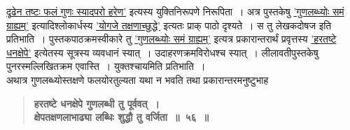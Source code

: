 \documentclass[11pt, openany]{book}
\begin{document}
\newpage

\begin{sloppypar}
\noindent \hyperref[5.51]{दृढेन तष्टः फलं गुणः स्यादपरो हरेण'} इत्यस्य युक्तिनिरूपणे निरूपिता~। अत्र पुस्तकेषु \hyperref[5.55]{'गुणलब्ध्योः समं ग्राह्यम्'} इत्यादिश्लोकार्धस्य \hyperref[5.54]{'योगजे तक्षणाच्छुद्धे'} इत्यतः प्राक् पाठो दृश्यते~। स तु लेखकदोषज इति प्रतिभाति~। पुस्तकपाठक्रमस्वीकारे तु \hyperref[5.55]{'गुणलब्ध्योः समं ग्राह्यम्'} इत्यत्र प्रकारान्तरार्थं प्रवृत्तस्य \hyperref[5.56]{'हरतष्टे धनक्षेपे'} इत्येतस्य सूत्रस्य व्यवधानं स्यात्~। उदाहरणक्रमविरोधश्च स्यात्~। लीलावतीपुस्तकेषु पुनरस्मल्लिखितक्रम एवास्ति~। युक्तश्चायमिति प्रतिभाति~। \\

{\small अथात्र गुणलब्ध्योस्तक्षणे फलयोरतुल्यता यथा न भवति तथा प्रकारान्तरमनुष्टुभाह\textendash }

 \label{5.56}
\begin{quote}
{\large \textbf{{\color{purple}हरतष्टे धनक्षेपे गुणलब्धी तु पूर्ववत्~।\\
क्षेपतक्षणलाभाढ्या लब्धिः शुद्धौ तु वर्जिता~॥~५६~॥}}}
\end{quote}


\end{sloppypar}
\end{document}

